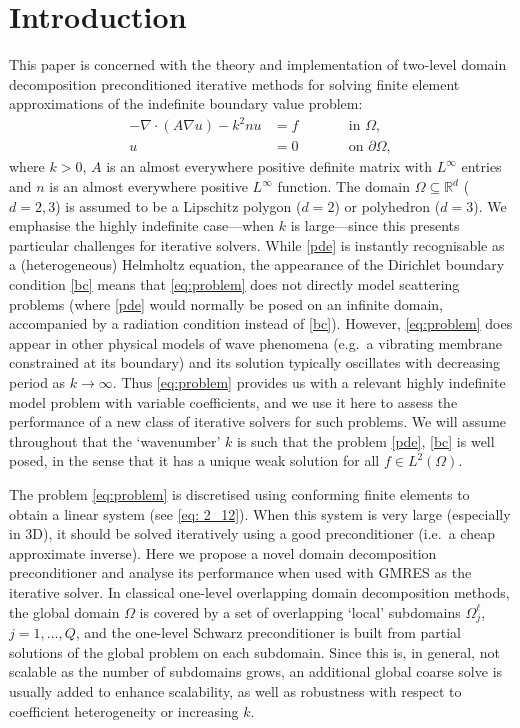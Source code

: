 \documentclass[numbers,webpdf,imaiai]{ima-authoring-template}%
\theoremstyle{thmstyletwo}%
\numberwithin{equation}{section}
\numberwithin{equation}{section}
\begin{document}
\section{Introduction}
This paper is concerned with the theory and implementation of two-level domain decomposition
preconditioned iterative methods for solving finite element approximations of the indefinite boundary value problem: 
\begin{subequations}
\label{eq:problem}
	\begin{alignat}{2}
		-\nabla \cdot (A \nabla u) - k^2 n u &= f \qquad && \text{in } \Omega, 
		\label{pde} \\
		u &= 0 \qquad && \text{on } \partial\Omega,
		\label{bc}
	\end{alignat}
\end{subequations}
where $k>0$, $A$ is an almost everywhere positive definite matrix with $L^\infty$ entries and $n$ is 
an almost everywhere positive $L^\infty$ function. 
The  domain $\Omega \subseteq \mathbb{R}^{d}$ ($d=2,3$) is assumed to be a Lipschitz polygon ($d=2$) or polyhedron ($d=3$). 
We emphasise the highly indefinite case---when $k$ is large---since this presents particular challenges for iterative solvers. 
While \eqref{pde} is instantly recognisable as a (heterogeneous) Helmholtz equation, the appearance of the Dirichlet boundary condition \eqref{bc} 
means that  \eqref{eq:problem} does not directly model scattering problems (where \eqref{pde} would normally be posed on an infinite domain, 
accompanied by a radiation condition instead of \eqref{bc}). 
However, \eqref{eq:problem} does appear in other physical models of wave phenomena (e.g.\ a vibrating membrane constrained at its boundary) 
and its solution typically oscillates with decreasing period as $k \rightarrow \infty$. 
Thus \eqref{eq:problem} provides us with a relevant highly indefinite model problem with variable coefficients, 
and we use it here to assess the performance of a new class of iterative solvers for such problems. 
We will assume throughout that the `wavenumber' $k$ is such that the problem \eqref{pde}, \eqref{bc} is well posed,
in the sense that it has a unique weak solution for all $f \in L^2(\Omega)$. 

The problem \eqref{eq:problem} is discretised using conforming finite elements to obtain a linear system (see \eqref{eq: 2_12}). 
When this system is very large (especially in 3D), it should be solved iteratively using a good preconditioner 
(i.e.\ a cheap approximate inverse).  
Here we propose a novel  domain decomposition preconditioner and analyse its performance when used with GMRES as the iterative solver. 
In classical one-level overlapping domain decomposition methods, the global domain $\Omega$ is covered by a set of 
overlapping `local' subdomains $\Omega_j^\ell$, $j=1,\ldots,Q$,
and the one-level Schwarz preconditioner is built from partial solutions of the global problem on each subdomain.
Since this is, in general, not scalable as the number of subdomains grows, an additional global coarse solve is usually added to enhance scalability, 
as well as robustness with respect to coefficient heterogeneity or increasing $k$.
\end{document}
